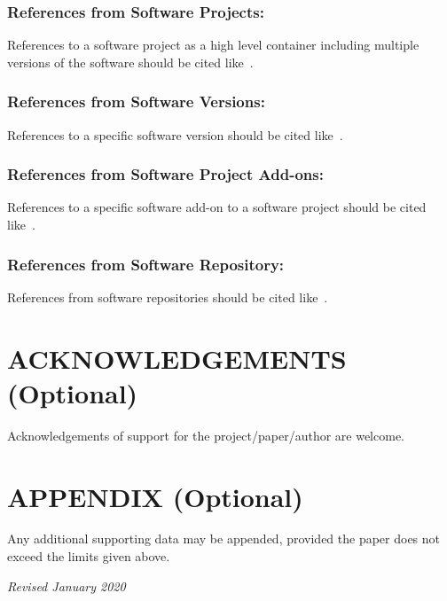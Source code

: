 \documentclass{isprs} %
\begin{document}
\subsubsection{References from Software Projects:}
References to a software project as a high level container including multiple versions of the software should be cited like~\cite{grass2017}.

\subsubsection{References from Software Versions:}
References to a specific software version should be cited like~\cite{grass2015}.

\subsubsection{References from Software Project Add-ons:}
References to a specific software add-on to a software project should be cited like~\cite{lennert2017}.

\subsubsection{References from Software Repository:}
References from software repositories should be cited like~\cite{gago2016}.

\section*{ACKNOWLEDGEMENTS (Optional)}\label{ACKNOWLEDGEMENTS}
Acknowledgements of support for the project/paper/author are welcome. 

{
	\begin{spacing}{1.17}
		\normalsize
	\end{spacing}
}


\section*{APPENDIX (Optional)}\label{APPENDIX}

Any additional supporting data may be appended, provided the paper does not exceed the limits given above. 

\vspace{1cm}
\textit{Revised January 2020}
\end{document}
